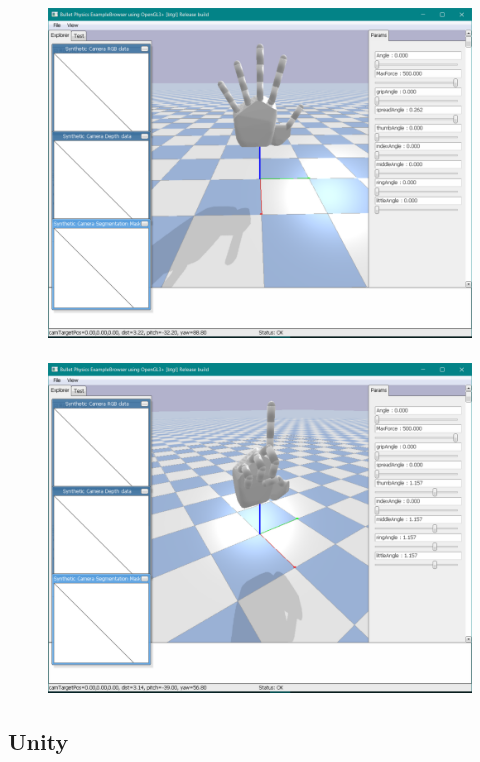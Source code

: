 \begin{figure}[htb] %
    \centering
    \subfloat
        {\includegraphics[height=.27\textheight]{immagini/pybullet urdf spread.PNG}}\
    \subfloat
        {\includegraphics[height=.27\textheight]{immagini/pybullet urdf point.PNG}}
\end{figure}

\clearpage

\subsection{Unity}


